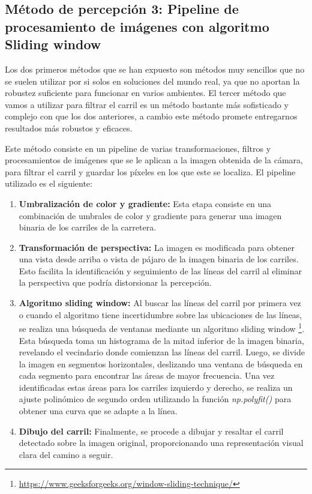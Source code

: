 \subsection{Método de percepción 3: Pipeline de procesamiento de imágenes con algoritmo Sliding window}
\label{Método 3: Pipeline de procesamiento de imágenes con algoritmo Sliding window}

Los dos primeros métodos que se han expuesto son métodos muy sencillos que no se suelen utilizar por si solos en soluciones del mundo real, ya que no aportan la robustez suficiente para funcionar en varios ambientes. El tercer método que vamos a utilizar para filtrar el carril es un método bastante más sofisticado y complejo con que los dos anteriores, a cambio este método promete entregarnos resultados más robustos y eficaces.

\bigskip

Este método consiste en un pipeline de varias transformaciones, filtros y procesamientos de imágenes que se le aplican a la imagen obtenida de la cámara, para filtrar el carril y guardar los píxeles en los que este se localiza. El pipeline utilizado es el siguiente:
\begin{enumerate}
    \item \textbf{Umbralización de color y gradiente:} Esta etapa consiste en una combinación de umbrales de color y gradiente para generar una imagen binaria de los carriles de la carretera.
    
    \item \textbf{Transformación de perspectiva:} La imagen es modificada para obtener una vista desde arriba o vista de pájaro de la imagen binaria de los carriles. Esto facilita la identificación y seguimiento de las líneas del carril al eliminar la perspectiva que podría distorsionar la percepción.
	
    \item \textbf{Algoritmo sliding window:} Al buscar las líneas del carril por primera vez o cuando el algoritmo tiene incertidumbre sobre las ubicaciones de las líneas, se realiza una búsqueda de ventanas mediante un algoritmo sliding window \footnote{\url{https://www.geeksforgeeks.org/window-sliding-technique/}}. Esta búsqueda toma un histograma de la mitad inferior de la imagen binaria, revelando el vecindario donde comienzan las líneas del carril. Luego, se divide la imagen en segmentos horizontales, deslizando una ventana de búsqueda en cada segmento para encontrar las áreas de mayor frecuencia. Una vez identificadas estas áreas para los carriles izquierdo y derecho, se realiza un ajuste polinómico de segundo orden utilizando la función\textit{ np.polyfit()} para obtener una curva que se adapte a la línea.
        
    \item \textbf{Dibujo del carril:} Finalmente, se procede a dibujar y resaltar el carril detectado sobre la imagen original, proporcionando una representación visual clara del camino a seguir.
\end{enumerate}

